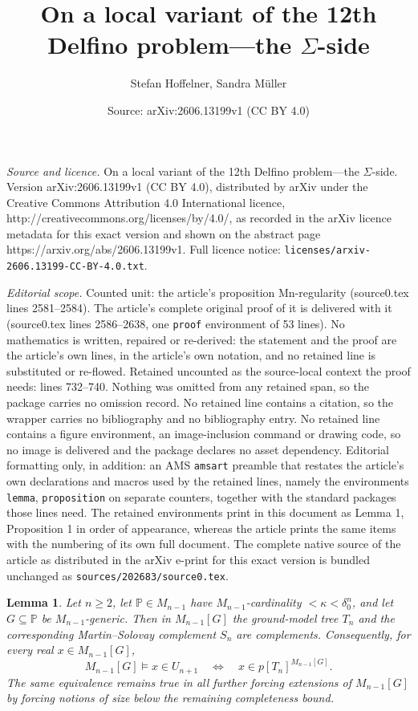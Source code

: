 \documentclass[10pt,a4paper]{amsart}
\title{On a local variant of the 12th Delfino problem---the $\Sigma$-side}
\author{Stefan Hoffelner, Sandra M\"uller}
\date{Source: arXiv:2606.13199v1 (CC BY 4.0)}
\newtheorem{lemma}{Lemma}
\begin{document}
\maketitle

\noindent\emph{Source and licence.} On a local variant of the 12th Delfino problem---the $\Sigma$-side. Version arXiv:2606.13199v1 (CC BY 4.0), distributed by arXiv under the Creative Commons Attribution 4.0 International licence, http://creativecommons.org/licenses/by/4.0/, as recorded in the arXiv licence metadata for this exact version and shown on the abstract page https://arxiv.org/abs/2606.13199v1. Full licence notice: \texttt{licenses/arxiv-2606.13199-CC-BY-4.0.txt}.\par\smallskip

\noindent\textit{Editorial scope.} Counted unit: the article's proposition Mn-regularity (source0.tex lines 2581--2584). The article's complete original proof of it is delivered with it (source0.tex lines 2586--2638, one \texttt{proof} environment of 53 lines). No mathematics is written, repaired or re-derived: the statement and the proof are the article's own lines, in the article's own notation, and no retained line is substituted or re-flowed.  Retained uncounted as the source-local context the proof needs: lines 732--740.  Nothing was omitted from any retained span, so the package carries no omission record.  No retained line contains a citation, so the wrapper carries no bibliography and no bibliography entry.  No retained line contains a figure environment, an image-inclusion command or drawing code, so no image is delivered and the package declares no asset dependency.  Editorial formatting only, in addition: an AMS \texttt{amsart} preamble that restates the article's own declarations and macros used by the retained lines, namely the environments \texttt{lemma}, \texttt{proposition} on separate counters, together with the standard packages those lines need.  The retained environments print in this document as Lemma 1, Proposition 1 in order of appearance, whereas the article prints the same items with the numbering of its own full document.  The complete native source of the article as distributed in the arXiv e-print for this exact version is bundled unchanged as \texttt{sources/202683/source0.tex}.
\begin{lemma}\label{lem:tn-small-generic-absoluteness}
Let $n\geq 2$, let $\mathbb P\in M_{n-1}$ have $M_{n-1}$-cardinality $<\kappa<\delta^n_0$, and let $G\subseteq\mathbb P$ be $M_{n-1}$-generic.  Then in $M_{n-1}[G]$ the ground-model tree $T_n$ and the corresponding Martin--Solovay complement $S_n$ are complements.  Consequently, for every real $x\in M_{n-1}[G]$,
\[
   M_{n-1}[G]\models x\in U_{n+1}
   \quad\Longleftrightarrow\quad
   x\in p[T_n]^{M_{n-1}[G]} .
\]
The same equivalence remains true in all further forcing extensions of $M_{n-1}[G]$ by forcing notions of size below the remaining completeness bound.
\end{lemma}
\end{document}

